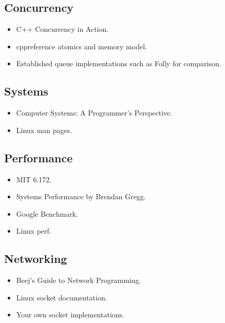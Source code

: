 \documentclass[11pt,letterpaper]{article}
\begin{document}
\subsection*{Concurrency}

\begin{itemize}

\item C++ Concurrency in Action.

\item cppreference atomics and memory model.

\item Established queue implementations such as Folly for comparison.

\end{itemize}

\subsection*{Systems}

\begin{itemize}

\item Computer Systems: A Programmer's Perspective.

\item Linux man pages.

\end{itemize}

\subsection*{Performance}

\begin{itemize}

\item MIT 6.172.

\item Systems Performance by Brendan Gregg.

\item Google Benchmark.

\item Linux perf.

\end{itemize}

\subsection*{Networking}

\begin{itemize}

\item Beej's Guide to Network Programming.

\item Linux socket documentation.

\item Your own socket implementations.

\end{itemize}
\end{document}
